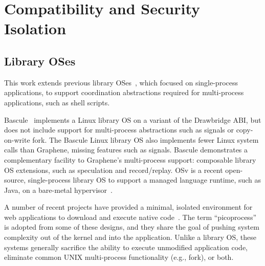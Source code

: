 \section{Compatibility and Security Isolation}


\begin{comment}
Recent library OSes, including Graphene,
search for a better
division of labor between the host kernel and guests.
Paravirtualized VMs attempt to move away from modeling specific hardware designs in software
toward a more virtualization-friendly hardware model~\citep{barham03xen,whitaker02denali, eiraku09outsourcing}.
Library OSes can be viewed as extreme paravirtualization---attempting
to find the most ideal interface between guest and host. %
\end{comment}

\subsection{Library OSes}


This work extends previous library OSes~\citep{porter11drawbridge,xax,unikernels,baumann13bascule,osv},
which focused on single-process applications,
to support coordination abstractions required 
for multi-process applications, such as shell scripts.


Bascule~\citep{baumann13bascule} implements a Linux library OS on a variant of the Drawbridge ABI,
but does not include support for multi-process abstractions such as signals or copy-on-write fork.
The Bascule Linux library OS also implements fewer Linux system calls than Graphene, missing
features such as signals.
Bascule demonstrates a complementary facility to Graphene's multi-process support: composable library OS extensions, 
such as speculation and record/replay.
OSv is a recent open-source, %
single-process 
library OS to support a managed language runtime, such as Java, on a bare-metal hypervisor~\citep{osv}.


A number of recent projects have provided a minimal, isolated environment
for web applications to download and execute native code~\citep{nacl,xax,howell13refactoring,gazelle,atlantis}.
The term ``picoprocess'' is adopted from some of these designs, and they share 
the goal of pushing system complexity out of the kernel and into the application.
Unlike a library OS, these systems
generally sacrifice the ability to execute unmodified application code, 
eliminate common UNIX multi-process functionality (e.g., fork), or both.


